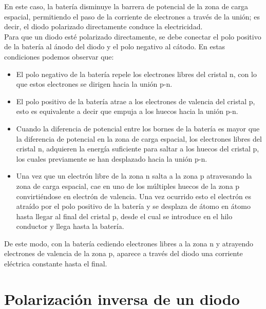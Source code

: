 En este caso, la batería disminuye la barrera de potencial de la zona de carga espacial, permitiendo el paso de la corriente de electrones a través de la unión; es decir, el diodo polarizado directamente conduce la electricidad.\citep{diodoWiki}\\

Para que un diodo esté polarizado directamente, se debe conectar el polo positivo de la batería al ánodo del diodo y el polo negativo al cátodo. En estas condiciones podemos observar que:\citep{diodoWiki}\\



\begin{itemize}
    \item El polo negativo de la batería repele los electrones libres del cristal n, con lo que estos electrones se dirigen hacia la unión p-n.
    \item El polo positivo de la batería atrae a los electrones de valencia del cristal p, esto es equivalente a decir que empuja a los huecos hacia la unión p-n.
    \item Cuando la diferencia de potencial entre los bornes de la batería es mayor que la diferencia de potencial en la zona de carga espacial, los electrones libres del cristal n, adquieren la energía suficiente para saltar a los huecos del cristal p, los cuales previamente se han desplazado hacia la unión p-n.
    \item Una vez que un electrón libre de la zona n salta a la zona p atravesando la zona de carga espacial, cae en uno de los múltiples huecos de la zona p convirtiéndose en electrón de valencia. Una vez ocurrido esto el electrón es atraído por el polo positivo de la batería y se desplaza de átomo en átomo hasta llegar al final del cristal p, desde el cual se introduce en el hilo conductor y llega hasta la batería.
    \end{itemize}
    
    De este modo, con la batería cediendo electrones libres a la zona n y atrayendo electrones de valencia de la zona p, aparece a través del diodo una corriente eléctrica constante hasta el final.\citep{diodoWiki}\\




\section{Polarización inversa de un diodo}

